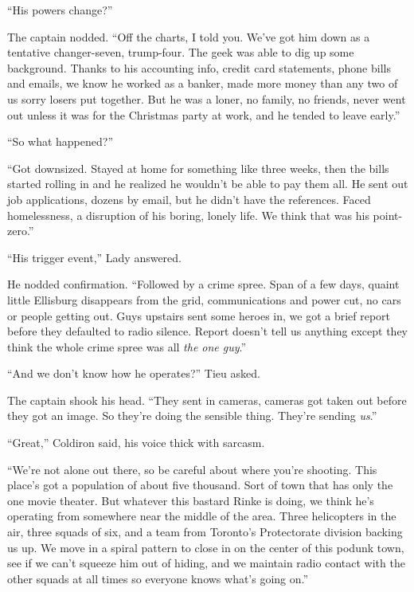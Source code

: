 ``His powers change?''



The captain nodded.  ``Off the charts, I told you.  We've got him down as a tentative changer-seven, trump-four.  The geek was able to dig up some background.  Thanks to his accounting info, credit card statements, phone bills and emails, we know he worked as a banker, made more money than any two of us sorry losers put together.  But he was a loner, no family, no friends, never went out unless it was for the Christmas party at work, and he tended to leave early.''



``So what happened?''



``Got downsized.  Stayed at home for something like three weeks, then the bills started rolling in and he realized he wouldn't be able to pay them all.  He sent out job applications, dozens by email, but he didn't have the references.  Faced homelessness, a disruption of his boring, lonely life.  We think that was his point-zero.''



``His trigger event,'' Lady answered.



He nodded confirmation.  ``Followed by a crime spree.  Span of a few days, quaint little Ellisburg disappears from the grid, communications and power cut, no cars or people getting out.  Guys upstairs sent some heroes in, we got a brief report before they defaulted to radio silence.  Report doesn't tell us anything except they think the whole crime spree was all \emph{the one guy}.''



``And we don't know how he operates?'' Tieu asked.



The captain shook his head.  ``They sent in cameras, cameras got taken out before they got an image.  So they're doing the sensible thing.  They're sending \emph{us}.''



``Great,'' Coldiron said, his voice thick with sarcasm.



``We're not alone out there, so be careful about where you're shooting.  This place's got a population of about five thousand.  Sort of town that has only the one movie theater.  But whatever this bastard Rinke is doing, we think he's operating from somewhere near the middle of the area.  Three helicopters in the air, three squads of six, and a team from Toronto's Protectorate division backing us up.  We move in a spiral pattern to close in on the center of this podunk town, see if we can't squeeze him out of hiding, and we maintain radio contact with the other squads at all times so everyone knows what's going on.''



